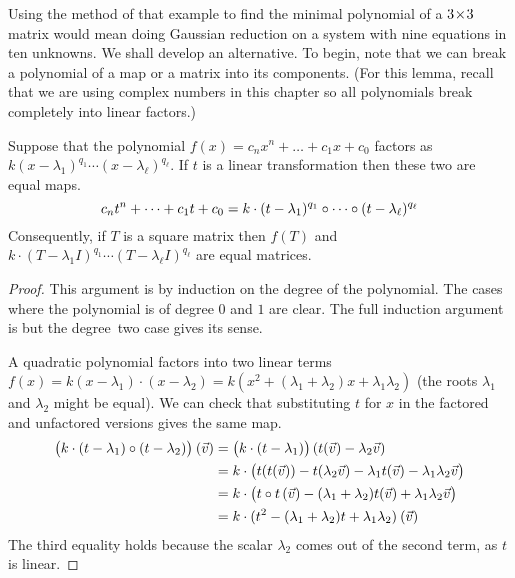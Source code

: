 Using the method of that example to find the minimal polynomial of a
\( 3 \! \times \! 3 \) matrix would mean doing Gaussian reduction on
a system with nine equations in ten unknowns.
We shall develop an alternative.
To begin, note that we can break a polynomial of a map or a matrix into
its components.
(For this lemma, recall that we are using complex numbers in this chapter
so all polynomials break completely into linear factors.)

\begin{lemma} \label{le:PolyMapsFactor}
Suppose that the polynomial \( f(x)=c_nx^n+\dots+c_1x+c_0 \) factors as
\( k(x-\lambda_1)^{q_1}\cdots(x-\lambda_\ell)^{q_\ell} \).
If \( t \) is a linear transformation then these two are equal maps. 
\begin{equation*}
  c_nt^n+\dots+c_1t+c_0
  =
  k\cdot(t-\lambda_1)^{q_1}\mathbin\circ \cdots\mathbin\circ 
      (t-\lambda_\ell)^{q_\ell} 
\end{equation*}
Consequently, if \( T \) is a square matrix then \( f(T) \) and
\( k\cdot(T-\lambda_1I)^{q_1}\cdots(T-\lambda_\ell I)^{q_\ell} \) 
are equal matrices.
\end{lemma}

\begin{proof}
This argument is by induction on the degree of the polynomial.
The cases where the polynomial is of
degree \( 0 \) and \( 1 \) are clear.
The full induction argument is 
but the degree~two case gives its sense.

A quadratic polynomial factors into two
linear terms \( f(x)=k(x-\lambda_1)\cdot(x-\lambda_2)
                    =k(x^2+(\lambda_1+\lambda_2)x+\lambda_1\lambda_2) \)
(the roots $\lambda_1$ and $\lambda_2$ might be equal).
We can check that substituting \( t \) 
for \( x \) in the factored and
unfactored versions gives the same map.
\begin{align*}
   \bigl(k\cdot(t-\lambda_1)\mathbin\circ (t-\lambda_2)\bigr)\>(\vec{v})
   &=\bigl(k\cdot(t-\lambda_1)\bigr)\,(t(\vec{v})-\lambda_2\vec{v})    \\
   &=k\cdot\bigl(t(t(\vec{v}))-t(\lambda_2\vec{v})
      -\lambda_1 t(\vec{v})-\lambda_1\lambda_2\vec{v}\bigr)    \\
   &=k\cdot \bigl(t\mathbin\circ t\,(\vec{v})-(\lambda_1+\lambda_2)t(\vec{v})
          +\lambda_1\lambda_2\vec{v}\bigr)                    \\
   &=k\cdot(t^2-(\lambda_1+\lambda_2)t+\lambda_1\lambda_2)\>(\vec{v})
\end{align*}
The third equality holds because the scalar $\lambda_2$  comes out of the
second term, as \( t \) is linear.
\end{proof}

